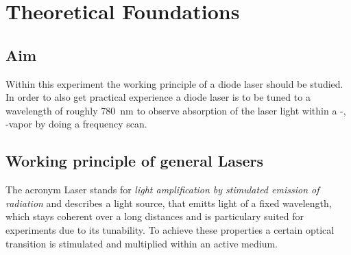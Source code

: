 \section{Theoretical Foundations}
    \subsection{Aim}
        Within this experiment the working principle of a diode laser should be studied. In order to also get practical experience a diode laser is to be tuned to a wavelength of roughly \SI{780}{\nano\metre}
        to observe absorption of the laser light within a -, -vapor by doing a frequency scan. 
    
    \subsection{Working principle of general Lasers}
        The acronym Laser stands for \textit{light amplification by stimulated emission of radiation} and describes a light source, that emitts light of a fixed wavelength, which stays coherent over a long
        distances and is particulary suited for experiments due to its tunability. To achieve these properties a certain optical transition is stimulated and multiplied within an active medium.

